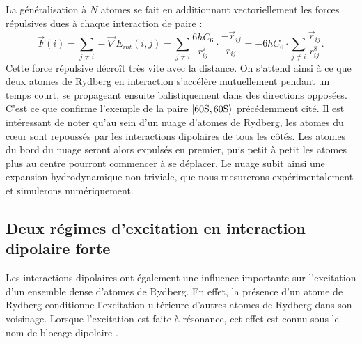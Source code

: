 La généralisation à $N$ atomes se fait en additionnant vectoriellement les forces répulsives dues à chaque interaction de paire :
\begin{equation}
\label{eq:repuls_Natomes}
\vec{F}(i) =  \sum_{j\neq i} -\vec{\nabla}E_{int}(i,j)
= \sum_{j\neq i} \frac{6hC_6}{r_{ij}^7} \cdot \frac{-\vec{r}_{ij}}{r_{ij}}
= - 6hC_6 \cdot \sum_{j\neq i} \frac{\vec{r}_{ij}}{r_{ij}^8}.
\end{equation}
%
Cette force répulsive décroît très vite avec la distance.
On s'attend ainsi à ce que deux atomes de Rydberg en interaction s'accélère mutuellement pendant un temps court, se propageant ensuite balistiquement dans des directions opposées.
C'est ce que confirme l'exemple de la paire $\ket{\mathrm{60S,60S}}$ précédemment cité.
Il est intéressant de noter qu'au sein d'un nuage d'atomes de Rydberg, les atomes du c\oe ur  sont repoussés par les interactions dipolaires de tous les côtés.
Les atomes du bord du nuage seront alors expulsés en premier, puis petit à petit les atomes plus au centre pourront commencer à se déplacer.
Le nuage subit ainsi une expansion hydrodynamique non triviale, que nous mesurerons expérimentalement et simulerons numériquement.

	\subsection{Deux régimes d'excitation en interaction dipolaire forte}\label{subsec:excitation_bloc_facil}

\noindent Les interactions dipolaires ont également une influence importante sur l'excitation d'un ensemble dense d'atomes de Rydberg.	
En effet, la présence d'un atome de Rydberg conditionne l'excitation ultérieure d'autres atomes de Rydberg dans son voisinage.
Lorsque l'excitation est faite à résonance, cet effet est connu sous le nom de \og blocage dipolaire \fg{}.

